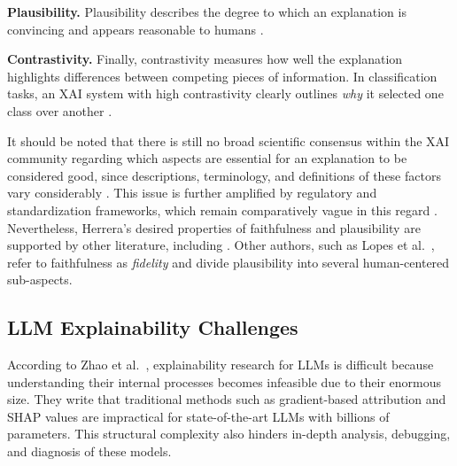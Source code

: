 \noindent\textbf{Plausibility.} Plausibility describes the degree to which an explanation is convincing and appears reasonable to humans \cite{zhuExplanationEraLarge2024, jacoviFaithfullyInterpretableNLP2020}.

\noindent\textbf{Contrastivity.} Finally, contrastivity measures how well the explanation highlights differences between competing pieces of information. In classification tasks, an XAI system with high contrastivity clearly outlines \textit{why} it selected one class over another \cite{herreraMakingSenseUnsensible2025, mershaUnifiedFrameworkNovel2025, stepinSurveyContrastiveCounterfactual2021}.

It should be noted that there is still no broad scientific consensus within the XAI community regarding which aspects are essential for an explanation to be considered good, since descriptions, terminology, and definitions of these factors vary considerably \cite{phillipsFourPrinciplesExplainable2021, aliExplainableArtificialIntelligence2023, lopesXAISystemsEvaluation2022, mershaUnifiedFrameworkNovel2025}. This issue is further amplified by regulatory and standardization frameworks, which remain comparatively vague in this regard \cite{RegulationEU20242024, ISOIECTR}. Nevertheless, Herrera's \cite{herreraMakingSenseUnsensible2025} desired properties of faithfulness and plausibility are supported by other literature, including \cite{jacoviFaithfullyInterpretableNLP2020, zhuExplanationEraLarge2024, turpinLanguageModelsDont2023}. Other authors, such as Lopes et al.~\cite{lopesXAISystemsEvaluation2022}, refer to faithfulness as \emph{fidelity} and divide plausibility into several human-centered sub-aspects.

\subsection{LLM Explainability Challenges}
\label{sec:challenges_in_llm_explainability_research}
According to Zhao et al.~\cite{zhaoExplainabilityLargeLanguage2024, luoUnderstandingUtilizationSurvey2024}, explainability research for LLMs is difficult because understanding their internal processes becomes infeasible due to their enormous size. They write that traditional methods such as gradient-based attribution \cite{sundararajanAxiomaticAttributionDeep2017} and SHAP values \cite{lundbergUnifiedApproachInterpreting2017} are impractical for state-of-the-art LLMs with billions of parameters. This structural complexity also hinders in-depth analysis, debugging, and diagnosis of these models.

